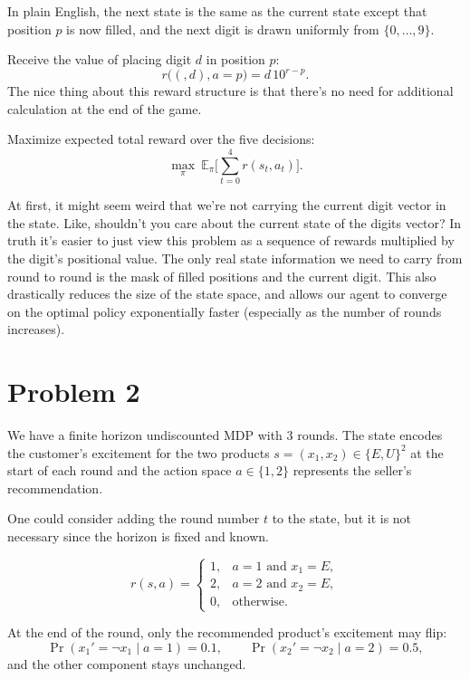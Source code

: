 \documentclass[12pt]{article}
\begin{document}
In plain English, the next state is the same as the current state except that position $p$ is now filled,
and the next digit is drawn uniformly from $\{0,\ldots,9\}$.

\medskip
\noindent{} Receive the value of placing digit $d$ in position $p$:
\[
		r\big((\bm,d),a=p\big)= d\,10^{r-p}.
\]
The nice thing about this reward structure is that there's no need for additional calculation at
the end of the game.

\medskip
\noindent{} Maximize expected total reward over the five decisions:
\[
		\max_{\pi}\ \mathbb{E}_{\pi}\Big[\sum_{t=0}^{4} r(s_t,a_t)\Big].
\]

At first, it might seem weird that we're not carrying the current digit vector in the state. Like, shouldn't you care
about the current state of the digits vector? In truth it's easier to just view this problem as a sequence of rewards
multiplied by the digit's positional value. The only real state information we need to carry from round to round is
the mask of filled positions and the current digit. This also drastically reduces the size of the state space, and allows
our agent to converge on the optimal policy exponentially faster (especially as the number of rounds increases).

\newpage
\section*{Problem 2}


We have a finite horizon undiscounted MDP with 3 rounds. The state encodes the customer's excitement
for the two products $s=(x_1,x_2)\in\{E,U\}^2$ at the start of each round and the action space
$a\in\{1,2\}$ represents the seller's recommendation.

One could consider adding the round number $t$ to the state, but it is not necessary since the horizon is fixed and known.

\medskip
\noindent{}
\[
		r(s,a)=
		\begin{cases}
				1, & a=1 \text{ and } x_1=E,\\
				2, & a=2 \text{ and } x_2=E,\\
				0, & \text{otherwise.}
		\end{cases}
\]

\medskip
\noindent{}
At the end of the round, only the recommended product’s excitement may flip:
\[
		\Pr(x_1'=\neg x_1\mid a=1)=0.1,\qquad \Pr(x_2'=\neg x_2\mid a=2)=0.5,
\]
and the other component stays unchanged.
\end{document}
